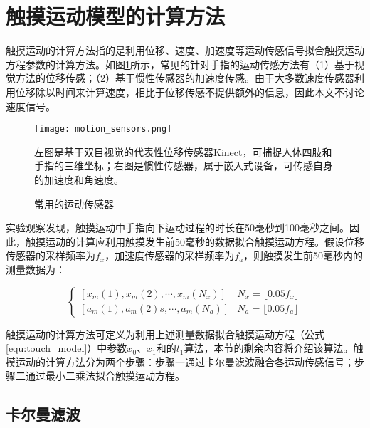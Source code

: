 \section{触摸运动模型的计算方法}

触摸运动的计算方法指的是利用位移、速度、加速度等运动传感信号拟合触摸运动方程参数的计算方法。如图\ref{fig:motion_sensors}所示，常见的针对手指的运动传感方法有（1）基于视觉方法的位移传感\cite{harrison2011omnitouch, xiao2018mrtouch, paradiso2000sensor, agarwal2007high, chang2005real, letessier2004visual, sugita2008touch, grudin2001integrating, saba2012dante, xiao2016direct, benko2012miragetable, wilson2010combining, newcombe2011kinectfusion, mistry2011mouseless, xiao2013worldkit}；（2）基于惯性传感器的加速度传感\cite{gu2019accurate, shi2020ready, gu2020qwertyring, meier2021tapld, lam2002mids, oh2017anywheretouch, niikura2014anywhere, liu2020keep}。由于大多数速度传感器利用位移除以时间来计算速度，相比于位移传感不提供额外的信息，因此本文不讨论速度信号。

\begin{figure}
	\centering
	\texttt{[image: motion\_sensors.png]}
	\caption*{左图是基于双目视觉的代表性位移传感器Kinect\cite{zhang2012microsoft}，可捕捉人体四肢和手指的三维坐标；右图是惯性传感器，属于嵌入式设备，可传感自身的加速度和角速度。}
	\caption{常用的运动传感器}
	\label{fig:motion_sensors}
\end{figure}

实验观察发现，触摸运动中手指向下运动过程的时长在50毫秒到100毫秒之间。因此，触摸运动的计算应利用触摸发生前50毫秒的数据拟合触摸运动方程。假设位移传感器的采样频率为$f_x$，加速度传感器的采样频率为$f_a$，则触摸发生前50毫秒内的测量数据为：

\begin{equation}
\begin{cases}
[x_m(1), x_m(2), \cdots, x_m(N_x)]& N_x=\lfloor0.05f_x\rfloor \\
[a_m(1), a_m(2)s, \cdots, a_m(N_a)]& N_a=\lfloor0.05f_a\rfloor
\end{cases}
\end{equation}

触摸运动的计算方法可定义为利用上述测量数据拟合触摸运动方程（公式\ref{equ:touch_model}）中参数$x_0$、$x_1$和的$t_1$算法，本节的剩余内容将介绍该算法。触摸运动的计算方法分为两个步骤：步骤一通过卡尔曼滤波融合各运动传感信号；步骤二通过最小二乘法拟合触摸运动方程。

\subsection{卡尔曼滤波}

